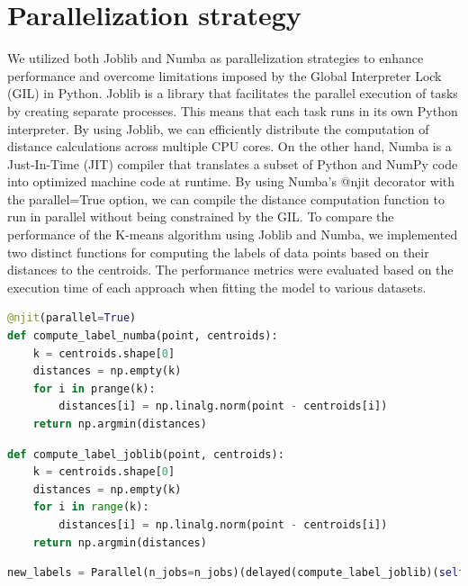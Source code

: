 \documentclass[10pt,twocolumn,letterpaper]{article}
\begin{document}
\section{Parallelization strategy}
We utilized both Joblib and Numba as parallelization strategies to enhance performance and overcome limitations imposed by the Global Interpreter Lock (GIL) in Python.
Joblib is a library that facilitates the parallel execution of tasks by creating separate processes. This means that each task runs in its own Python interpreter. By using Joblib, we can efficiently distribute the computation of distance calculations across multiple CPU cores.
On the other hand, Numba is a Just-In-Time (JIT) compiler that translates a subset of Python and NumPy code into optimized machine code at runtime. By using Numba's @njit decorator with the parallel=True option, we can compile the distance computation function to run in parallel without being constrained by the GIL. 
To compare the performance of the K-means algorithm using Joblib and Numba, we implemented two distinct functions for computing the labels of data points based on their distances to the centroids. The performance metrics were evaluated based on the execution time of each approach when fitting the model to various datasets.

\begin{lstlisting}[style=python, language=python, label={lst:numba}, caption={numba implementation}] 
@njit(parallel=True)
def compute_label_numba(point, centroids):
	k = centroids.shape[0]
	distances = np.empty(k)
	for i in prange(k):
		distances[i] = np.linalg.norm(point - centroids[i])
	return np.argmin(distances)
\end{lstlisting}

\begin{lstlisting}[style=python, language=python, label={lst:joblib}, caption={Serial and Joblib Jmplementation}] 
def compute_label_joblib(point, centroids):
	k = centroids.shape[0]
	distances = np.empty(k)
	for i in range(k):
		distances[i] = np.linalg.norm(point - centroids[i])
	return np.argmin(distances)
\end{lstlisting}

\begin{lstlisting}[style=python, language=python, label={lst:call}, caption={Joblip parallel call}] 
new_labels = Parallel(n_jobs=n_jobs)(delayed(compute_label_joblib)(self.points[i], self.centroids) for i in range(self.points.shape[0]))
\end{lstlisting}
\end{document}
